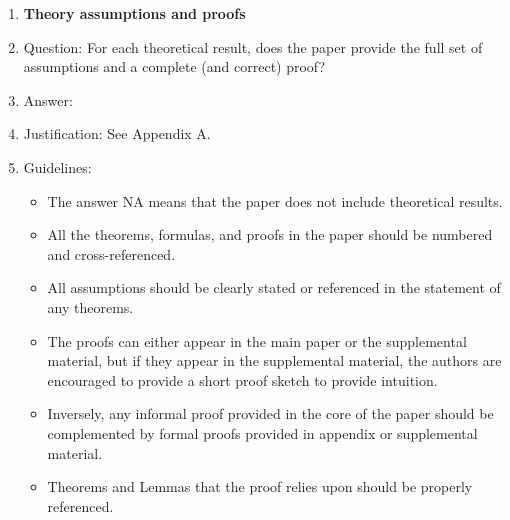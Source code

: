 \documentclass{article}
\theoremstyle{plain}
\theoremstyle{definition}
\theoremstyle{remark}
\begin{document}
\begin{enumerate}
\item {\bf Theory assumptions and proofs}
    \item[] Question: For each theoretical result, does the paper provide the full set of assumptions and a complete (and correct) proof?
    \item[] Answer: \answerYes{} %
    \item[] Justification: See Appendix A.
    \item[] Guidelines:
    \begin{itemize}
        \item The answer NA means that the paper does not include theoretical results. 
        \item All the theorems, formulas, and proofs in the paper should be numbered and cross-referenced.
        \item All assumptions should be clearly stated or referenced in the statement of any theorems.
        \item The proofs can either appear in the main paper or the supplemental material, but if they appear in the supplemental material, the authors are encouraged to provide a short proof sketch to provide intuition. 
        \item Inversely, any informal proof provided in the core of the paper should be complemented by formal proofs provided in appendix or supplemental material.
        \item Theorems and Lemmas that the proof relies upon should be properly referenced. 
    \end{itemize}


\end{enumerate}
\end{document}
